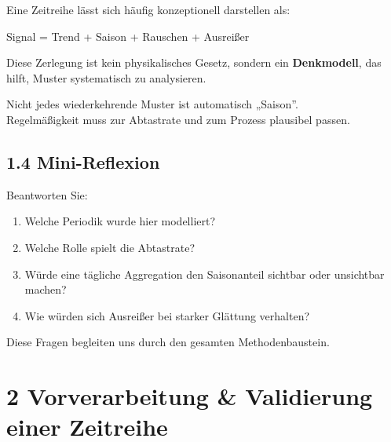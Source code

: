 \documentclass[
  ngerman,
  letterpaper,
  DIV=11]{scrreprt}
\providecommand{\tightlist}{%
  \setlength{\itemsep}{0pt}\setlength{\parskip}{0pt}}
\begin{document}
Eine Zeitreihe lässt sich häufig konzeptionell darstellen als:

Signal = Trend + Saison + Rauschen + Ausreißer

Diese Zerlegung ist kein physikalisches Gesetz, sondern ein
\textbf{Denkmodell}, das hilft, Muster systematisch zu analysieren.

\begin{tcolorbox}[enhanced jigsaw, titlerule=0mm, title=\textcolor{quarto-callout-warning-color}{\faExclamationTriangle}\hspace{0.5em}{Achtung}, bottomrule=.15mm, opacityback=0, colbacktitle=quarto-callout-warning-color!10!white, coltitle=black, opacitybacktitle=0.6, colframe=quarto-callout-warning-color-frame, toprule=.15mm, leftrule=.75mm, arc=.35mm, rightrule=.15mm, breakable, bottomtitle=1mm, colback=white, toptitle=1mm, left=2mm]

Nicht jedes wiederkehrende Muster ist automatisch „Saison''.\\
Regelmäßigkeit muss zur Abtastrate und zum Prozess plausibel passen.

\end{tcolorbox}

\section{1.4 Mini-Reflexion}\label{mini-reflexion}

Beantworten Sie:

\begin{enumerate}
\def\labelenumi{\arabic{enumi}.}
\tightlist
\item
  Welche Periodik wurde hier modelliert?
\item
  Welche Rolle spielt die Abtastrate?
\item
  Würde eine tägliche Aggregation den Saisonanteil sichtbar oder
  unsichtbar machen?
\item
  Wie würden sich Ausreißer bei starker Glättung verhalten?
\end{enumerate}

Diese Fragen begleiten uns durch den gesamten Methodenbaustein.


\chapter{2 Vorverarbeitung \& Validierung einer
Zeitreihe}\label{vorverarbeitung-validierung-einer-zeitreihe}
\end{document}
